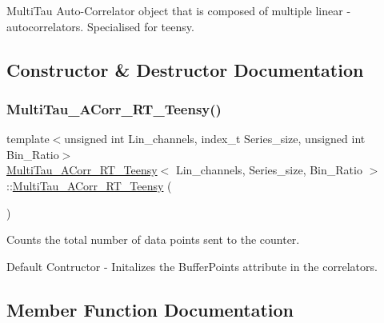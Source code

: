 Multi\+Tau Auto-\/\+Correlator object that is composed of multiple linear -\/ autocorrelators. Specialised for teensy. 

\subsection{Constructor \& Destructor Documentation}
\mbox{\label{classMultiTau__ACorr__RT__Teensy_a28cfdcd7468aac93693a4d4803fc95f9}} 
\subsubsection{\texorpdfstring{Multi\+Tau\+\_\+\+A\+Corr\+\_\+\+R\+T\+\_\+\+Teensy()}{MultiTau\_ACorr\_RT\_Teensy()}}
{\footnotesize\ttfamily template$<$unsigned int Lin\+\_\+channels, index\+\_\+t Series\+\_\+size, unsigned int Bin\+\_\+\+Ratio$>$ \\
\hyperlink{classMultiTau__ACorr__RT__Teensy}{Multi\+Tau\+\_\+\+A\+Corr\+\_\+\+R\+T\+\_\+\+Teensy}$<$ Lin\+\_\+channels, Series\+\_\+size, Bin\+\_\+\+Ratio $>$\+::\hyperlink{classMultiTau__ACorr__RT__Teensy}{Multi\+Tau\+\_\+\+A\+Corr\+\_\+\+R\+T\+\_\+\+Teensy} (\begin{DoxyParamCaption}{ }\end{DoxyParamCaption})\hspace{0.3cm}{\ttfamily [inline]}}



Counts the total number of data points sent to the counter. 

Default Contructor -\/ Initalizes the Buffer\+Points attribute in the correlators. 

\subsection{Member Function Documentation}
\mbox{\label{classMultiTau__ACorr__RT__Teensy_a37a29725971f15305398ac7c9c360eac}} 
